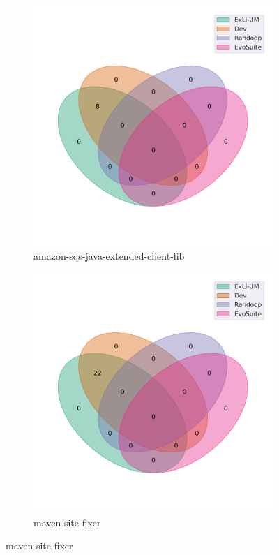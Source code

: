 \begin{figure}[t]\ContinuedFloat
\begin{subfigure}[b]{0.45\textwidth}
\includegraphics[width=\textwidth]{figures/venn/awslabs_amazon-sqs-java-extended-client-lib-venn.pdf}
\vspace{-10pt}
\caption{amazon-sqs-java-extended-client-lib}
\label{fig:venn-awslabs_amazon-sqs-java-extended-client-lib}
\end{subfigure}
\hfill
\begin{subfigure}[b]{0.45\textwidth}
\includegraphics[width=\textwidth]{figures/venn/Bernardo-MG_maven-site-fixer-venn.pdf}
\vspace{-10pt}
\caption{maven-site-fixer}
\label{fig:venn-Bernardo-MG_maven-site-fixer}
\end{subfigure}
\end{figure}
